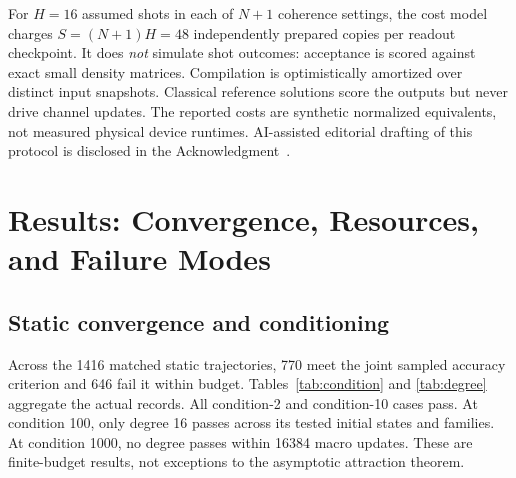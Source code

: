\documentclass{ieeeaccess}
\begin{document}
For $H=16$ assumed shots in each of $N+1$ coherence settings, the cost model charges $S=(N+1)H=48$ independently prepared copies per readout checkpoint. It does \emph{not} simulate shot outcomes: acceptance is scored against exact small density matrices. Compilation is optimistically amortized over distinct input snapshots. Classical reference solutions score the outputs but never drive channel updates. The reported costs are synthetic normalized equivalents, not measured physical device runtimes. AI-assisted editorial drafting of this protocol is disclosed in the Acknowledgment~\cite{openai2026}.

\section{Results: Convergence, Resources, and Failure Modes}

\subsection{Static convergence and conditioning}
Across the 1416 matched static trajectories, 770 meet the joint sampled accuracy criterion and 646 fail it within budget. Tables~\ref{tab:condition} and \ref{tab:degree} aggregate the actual records. All condition-2 and condition-10 cases pass. At condition 100, only degree 16 passes across its tested initial states and families. At condition 1000, no degree passes within 16384 macro updates. These are finite-budget results, not exceptions to the asymptotic attraction theorem.
\end{document}
